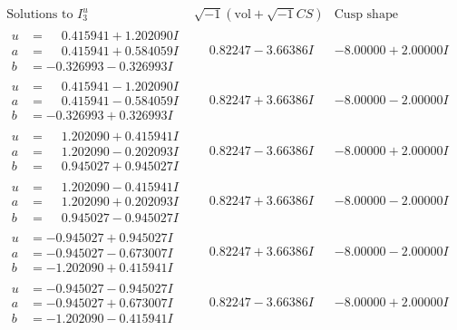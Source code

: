 \documentclass[1p]{elsarticle_modified}
\theoremstyle{definition}
\newcommand{\I}{\sqrt{-1}}
\begin{document}
$$\begin{array}{c|c|c}  
\text{Solutions to }I^u_{3}& \I (\text{vol} + \sqrt{-1}CS) & \text{Cusp shape}\\
 \hline 
\begin{aligned}
u &= \phantom{-}0.415941 + 1.202090 I \\
a &= \phantom{-}0.415941 + 0.584059 I \\
b &= -0.326993 - 0.326993 I\end{aligned}
 & \phantom{-}0.82247 - 3.66386 I & -8.00000 + 2.00000 I \\ \hline\begin{aligned}
u &= \phantom{-}0.415941 - 1.202090 I \\
a &= \phantom{-}0.415941 - 0.584059 I \\
b &= -0.326993 + 0.326993 I\end{aligned}
 & \phantom{-}0.82247 + 3.66386 I & -8.00000 - 2.00000 I \\ \hline\begin{aligned}
u &= \phantom{-}1.202090 + 0.415941 I \\
a &= \phantom{-}1.202090 - 0.202093 I \\
b &= \phantom{-}0.945027 + 0.945027 I\end{aligned}
 & \phantom{-}0.82247 - 3.66386 I & -8.00000 + 2.00000 I \\ \hline\begin{aligned}
u &= \phantom{-}1.202090 - 0.415941 I \\
a &= \phantom{-}1.202090 + 0.202093 I \\
b &= \phantom{-}0.945027 - 0.945027 I\end{aligned}
 & \phantom{-}0.82247 + 3.66386 I & -8.00000 - 2.00000 I \\ \hline\begin{aligned}
u &= -0.945027 + 0.945027 I \\
a &= -0.945027 - 0.673007 I \\
b &= -1.202090 + 0.415941 I\end{aligned}
 & \phantom{-}0.82247 + 3.66386 I & -8.00000 - 2.00000 I \\ \hline\begin{aligned}
u &= -0.945027 - 0.945027 I \\
a &= -0.945027 + 0.673007 I \\
b &= -1.202090 - 0.415941 I\end{aligned}
 & \phantom{-}0.82247 - 3.66386 I & -8.00000 + 2.00000 I \\ \hline\begin{aligned}

\end{aligned}
\end{array}$$
\end{document}
